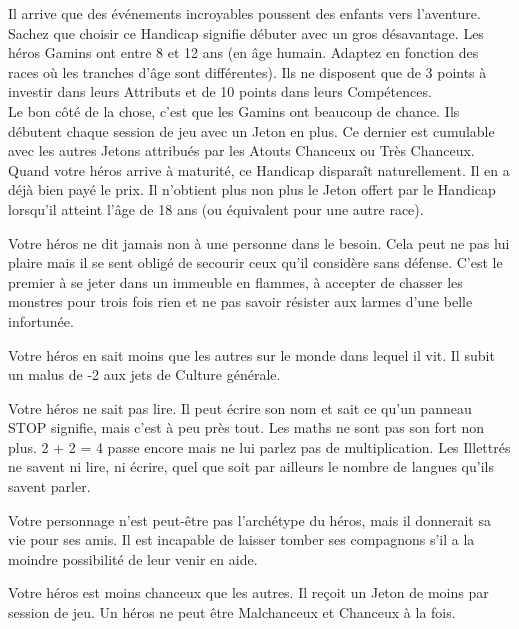 \begin{description}[align=left]
    \item [Gamin (Majeur)]
        Il arrive que des événements incroyables poussent des enfants vers l'aventure. Sachez que choisir ce Handicap signifie débuter avec un gros désavantage. Les héros Gamins ont entre 8 et 12 ans (en âge humain. Adaptez en fonction des races où les tranches d'âge sont différentes). Ils ne disposent que de 3 points à investir dans leurs Attributs et de 10 points dans leurs Compétences.\\
        Le bon côté de la chose, c'est que les Gamins ont beaucoup de chance. Ils débutent chaque session de jeu avec un Jeton en plus. Ce dernier est cumulable avec les autres Jetons attribués par les Atouts Chanceux ou Très Chanceux. Quand votre héros arrive à maturité, ce Handicap disparaît naturellement. Il en a déjà bien payé le prix. Il n'obtient plus non plus le Jeton offert par le Handicap lorsqu'il atteint l'âge de 18 ans (ou équivalent pour une autre race).

    \item [Héroïque (Majeur)]
        Votre héros ne dit jamais non à une personne dans le besoin. Cela peut ne pas lui plaire mais il se sent obligé de secourir ceux qu'il considère sans défense. C'est le premier à se jeter dans un immeuble en flammes, à accepter de chasser les monstres pour trois fois rien et ne pas savoir résister aux larmes d'une belle infortunée.

    \item [Ignorant (Majeur)]
        Votre héros en sait moins que les autres sur le monde dans lequel il vit. Il subit un malus de -2 aux jets de Culture générale.

    \item [Illettré (Mineur)]
        Votre héros ne sait pas lire. Il peut écrire son nom et sait ce qu'un panneau STOP signifie, mais c'est à peu près tout. Les maths ne sont pas son fort non plus. 2 + 2 = 4 passe encore mais ne lui parlez pas de multiplication. Les Illettrés ne savent ni lire, ni écrire, quel que soit par ailleurs le nombre de langues qu'ils savent parler.

    \item [Loyal (Mineur)]
        Votre personnage n'est peut-être pas l'archétype du héros, mais il donnerait sa vie pour ses amis. Il est incapable de laisser tomber ses compagnons s'il a la moindre possibilité de leur venir en aide.

    \item [Malchanceux (Majeur)]
        Votre héros est moins chanceux que les autres. Il reçoit un Jeton de moins par session de jeu. Un héros ne peut être Malchanceux et Chanceux à la fois.


\end{description}
